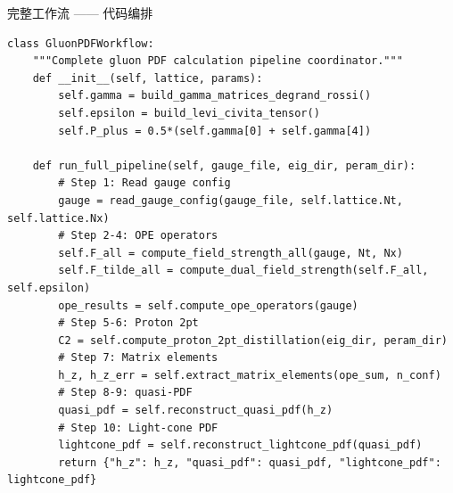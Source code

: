 \documentclass[10pt,aspectratio=169]{beamer}
\begin{document}
\begin{frame}[fragile]{完整工作流 —— 代码编排}
\begin{lstlisting}
class GluonPDFWorkflow:
    """Complete gluon PDF calculation pipeline coordinator."""
    def __init__(self, lattice, params):
        self.gamma = build_gamma_matrices_degrand_rossi()
        self.epsilon = build_levi_civita_tensor()
        self.P_plus = 0.5*(self.gamma[0] + self.gamma[4])

    def run_full_pipeline(self, gauge_file, eig_dir, peram_dir):
        # Step 1: Read gauge config
        gauge = read_gauge_config(gauge_file, self.lattice.Nt, self.lattice.Nx)
        # Step 2-4: OPE operators
        self.F_all = compute_field_strength_all(gauge, Nt, Nx)
        self.F_tilde_all = compute_dual_field_strength(self.F_all, self.epsilon)
        ope_results = self.compute_ope_operators(gauge)
        # Step 5-6: Proton 2pt
        C2 = self.compute_proton_2pt_distillation(eig_dir, peram_dir)
        # Step 7: Matrix elements
        h_z, h_z_err = self.extract_matrix_elements(ope_sum, n_conf)
        # Step 8-9: quasi-PDF
        quasi_pdf = self.reconstruct_quasi_pdf(h_z)
        # Step 10: Light-cone PDF
        lightcone_pdf = self.reconstruct_lightcone_pdf(quasi_pdf)
        return {"h_z": h_z, "quasi_pdf": quasi_pdf, "lightcone_pdf": lightcone_pdf}
\end{lstlisting}
\end{frame}
\end{document}
